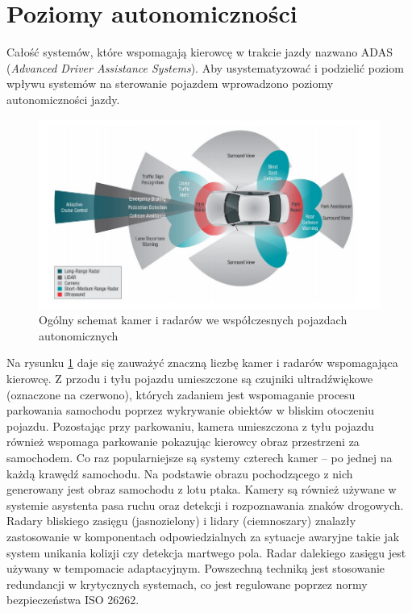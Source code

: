 
\section{Poziomy autonomiczności}

Całość systemów, które wspomagają kierowcę w trakcie jazdy nazwano ADAS (\textit{Advanced Driver Assistance Systems}). 
Aby usystematyzować i podzielić poziom wpływu systemów na sterowanie pojazdem wprowadzono poziomy autonomiczności jazdy.

\begin{figure}
  \centering
  \includegraphics[width=13cm]{img/systemy_autonomiczne_ogolnie.png}
  \caption{Ogólny schemat kamer i radarów we współczesnych pojazdach autonomicznych\cite{S1}}
  \label{fig:kamery_i_radary}
\end{figure}

Na rysunku \ref{fig:kamery_i_radary} daje się zauważyć znaczną liczbę kamer i radarów wspomagająca kierowcę. 
Z przodu i tyłu pojazdu umieszczone są czujniki ultradźwiękowe (oznaczone na czerwono), których zadaniem jest wspomaganie procesu parkowania samochodu poprzez wykrywanie obiektów w bliskim otoczeniu pojazdu.
Pozostając przy parkowaniu, kamera umieszczona z tyłu pojazdu również wspomaga parkowanie pokazując kierowcy obraz przestrzeni za samochodem. 
Co raz popularniejsze są systemy czterech kamer -- po jednej na każdą krawędź samochodu. 
Na podstawie obrazu pochodzącego z nich generowany jest obraz samochodu z lotu ptaka.
Kamery są również używane w systemie asystenta pasa ruchu oraz detekcji i rozpoznawania znaków drogowych.
Radary bliskiego zasięgu (jasnozielony) i lidary (ciemnoszary) znalazły zastosowanie w komponentach odpowiedzialnych za sytuacje awaryjne takie jak system unikania kolizji czy detekcja martwego pola.
Radar dalekiego zasięgu jest używany w tempomacie adaptacyjnym.
Powszechną techniką jest stosowanie redundancji w krytycznych systemach, co jest regulowane poprzez normy bezpieczeństwa ISO 26262.

